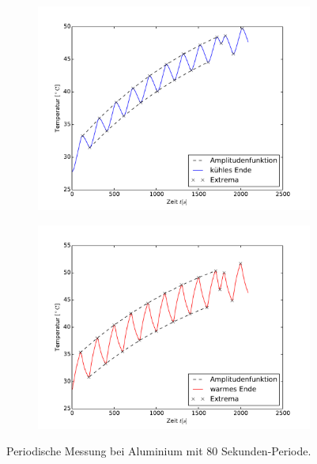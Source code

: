 \begin{figure}[h!]
	\centering
	\begin{subfigure}{0.9\textwidth}
	\centering
	\includegraphics[width=\textwidth]{Bilder/M2_Alu_kuehl.pdf}
	\end{subfigure}
	\begin{subfigure}{0.9\textwidth}
	\centering
	\includegraphics[width=\textwidth]{Bilder/M2_Alu_warm.pdf}
	\end{subfigure}
	\caption{Periodische Messung bei Aluminium mit 80 Sekunden-Periode.}
	\label{fig:M2Alu}
\end{figure}
